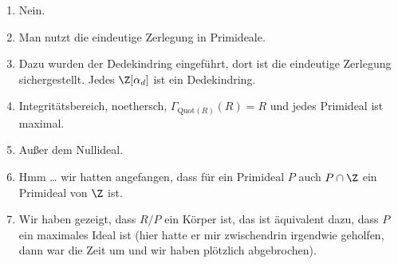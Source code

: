 \documentclass{scrartcl}
\begin{document}
\begin{enumerate}
		.
	\item
		Nein.
	\item
		Man nutzt die eindeutige Zerlegung in Primideale.
	\item
		Dazu wurden der Dedekindring eingeführt, dort ist die eindeutige Zerlegung sichergestellt.
		Jedes $\Z[\alpha_d]$ ist ein Dedekindring.
	\item
		Integritätsbereich, noethersch, $\Gamma_{\mathrm{Quot}(R)}(R) = R$ und jedes Primideal ist maximal.
	\item
		Außer dem Nullideal.
	\item
		Hmm … wir hatten angefangen, dass für ein Primideal $P$ auch $P \cap \Z$ ein Primideal von $\Z$ ist.
	\item
		Wir haben gezeigt, dass $R / P$ ein Körper ist, das ist äquivalent dazu, dass $P$ ein maximales Ideal ist (hier hatte er mir zwischendrin irgendwie geholfen, dann war die Zeit um und wir haben plötzlich abgebrochen).
\end{enumerate}
\end{document}
